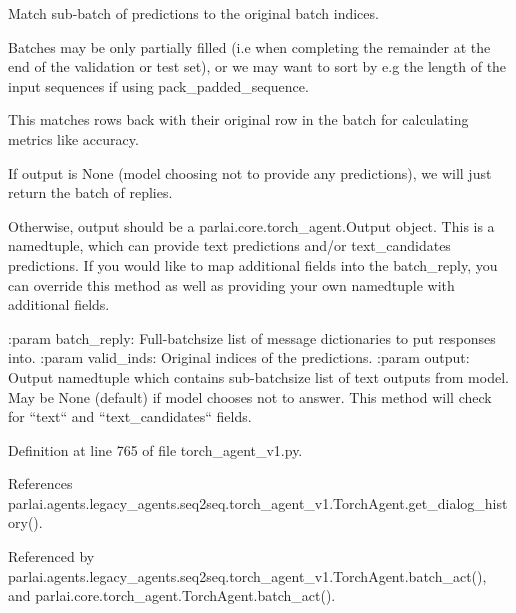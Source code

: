 \begin{DoxyVerb}Match sub-batch of predictions to the original batch indices.

Batches may be only partially filled (i.e when completing the remainder
at the end of the validation or test set), or we may want to sort by
e.g the length of the input sequences if using pack_padded_sequence.

This matches rows back with their original row in the batch for
calculating metrics like accuracy.

If output is None (model choosing not to provide any predictions), we
will just return the batch of replies.

Otherwise, output should be a parlai.core.torch_agent.Output object.
This is a namedtuple, which can provide text predictions and/or
text_candidates predictions. If you would like to map additional
fields into the batch_reply, you can override this method as well as
providing your own namedtuple with additional fields.

:param batch_reply: Full-batchsize list of message dictionaries to put
    responses into.
:param valid_inds: Original indices of the predictions.
:param output: Output namedtuple which contains sub-batchsize list of
    text outputs from model. May be None (default) if model chooses not
    to answer. This method will check for ``text`` and
    ``text_candidates`` fields.
\end{DoxyVerb}
 

Definition at line 765 of file torch\+\_\+agent\+\_\+v1.\+py.



References parlai.\+agents.\+legacy\+\_\+agents.\+seq2seq.\+torch\+\_\+agent\+\_\+v1.\+Torch\+Agent.\+get\+\_\+dialog\+\_\+history().



Referenced by parlai.\+agents.\+legacy\+\_\+agents.\+seq2seq.\+torch\+\_\+agent\+\_\+v1.\+Torch\+Agent.\+batch\+\_\+act(), and parlai.\+core.\+torch\+\_\+agent.\+Torch\+Agent.\+batch\+\_\+act().

